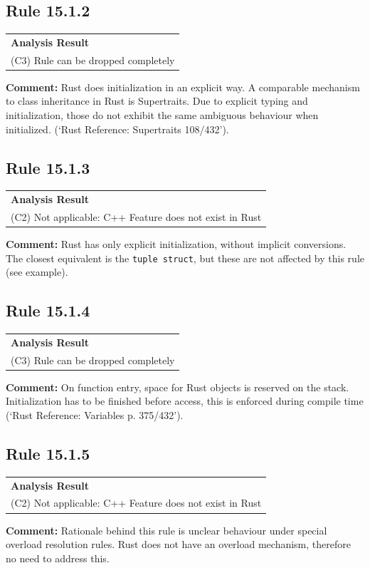 \subsection*{Rule 15.1.2}
\begin{longtable}{p{13cm}}
\textbf{Analysis Result} \\
(C3) Rule can be dropped completely \\
\end{longtable}
\textbf{Comment:} Rust does initialization in an explicit way. A comparable mechanism to class inheritance in Rust is Supertraits. Due to explicit typing and initialization, those do not exhibit the same ambiguous behaviour when initialized. (`Rust Reference: Supertraits 108/432'). \\
\subsection*{Rule 15.1.3}
\begin{longtable}{p{13cm}}
\textbf{Analysis Result} \\
(C2) Not applicable: C++ Feature does not exist in Rust \\
\end{longtable}
\textbf{Comment:} Rust has only explicit initialization, without implicit conversions. The closest equivalent is the \texttt{tuple struct}, but these are not affected by this rule (see example). \\


\subsection*{Rule 15.1.4}
\begin{longtable}{p{13cm}}
\textbf{Analysis Result} \\
(C3) Rule can be dropped completely \\
\end{longtable}
\textbf{Comment:} On function entry, space for Rust objects is reserved on the stack. Initialization has to be finished before access, this is enforced during compile time (`Rust Reference: Variables p. 375/432'). \\
\subsection*{Rule 15.1.5}
\begin{longtable}{p{13cm}}
\textbf{Analysis Result} \\
(C2) Not applicable: C++ Feature does not exist in Rust \\
\end{longtable}
\textbf{Comment:} Rationale behind this rule is unclear behaviour under special overload resolution rules. Rust does not have an overload mechanism, therefore no need to address this. \\
